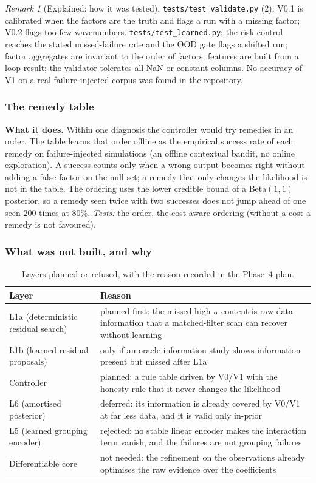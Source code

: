 \documentclass[11pt]{article}
\theoremstyle{plain}
\theoremstyle{definition}
\theoremstyle{remark}
\newtheorem{remark}[theorem]{Remark}
\newenvironment{explained}[1]{\begin{remark}[Explained: #1]}{\end{remark}}
\begin{document}
\begin{explained}{how it was tested}
\texttt{tests/test\_validate.py} ($2$): V0.1 is calibrated when the factors are the truth and flags a run with a missing factor; V0.2 flags too few wavenumbers. \texttt{tests/test\_learned.py}: the risk control reaches the stated missed-failure rate and the OOD gate flags a shifted run; factor aggregates are invariant to the order of factors; features are built from a loop result; the validator tolerates all-NaN or constant columns. No accuracy of V1 on a real failure-injected corpus was found in the repository.
\end{explained}

\subsubsection{The remedy table}
\textbf{What it does.} Within one diagnosis the controller would try remedies in an order. The table learns that order offline as the empirical success rate of each remedy on failure-injected simulations (an offline contextual bandit, no online exploration). A success counts only when a wrong output becomes right without adding a false factor on the null set; a remedy that only changes the likelihood is not in the table. The ordering uses the lower credible bound of a Beta$(1,1)$ posterior, so a remedy seen twice with two successes does not jump ahead of one seen $200$ times at $80\%$. \emph{Tests:} the order, the cost-aware ordering (without a cost a remedy is not favoured).

\subsubsection{What was not built, and why}
\begin{table}[!htb]
\centering\small
\begin{tabular}{@{}L{3.0cm}L{9.0cm}@{}}
\toprule
Layer & Reason \\\midrule
L1a (deterministic residual search) & planned first: the missed high-$\kappa$ content is raw-data information that a matched-filter scan can recover without learning\\
L1b (learned residual proposals) & only if an oracle information study shows information present but missed after L1a\\
Controller & planned: a rule table driven by V0/V1 with the honesty rule that it never changes the likelihood\\
L6 (amortised posterior) & deferred: its information is already covered by V0/V1 at far less data, and it is valid only in-prior\\
L5 (learned grouping encoder) & rejected: no stable linear encoder makes the interaction term vanish, and the failures are not grouping failures\\
Differentiable core & not needed: the refinement on the observations already optimises the raw evidence over the coefficients\\
\bottomrule
\end{tabular}
\caption{Layers planned or refused, with the reason recorded in the Phase~4 plan.}
\end{table}
\end{document}
